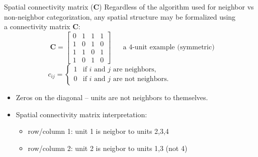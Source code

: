 \documentclass{beamer}
\begin{document}
\begin{frame}{Spatial connectivity matrix ($\bm{C}$)}
Regardless of the algorithm used for neighbor vs non-neighbor categorization, any spatial structure may be formalized using \\a connectivity matrix $\bm{C}$:
$$
~~\bm{C} = \begin{bmatrix}
0 & 1 & 1 & 1 \\
1 & 0 & 1 & 0 \\
1 & 1 & 0 & 1 \\
1 & 0 & 1 & 0
\end{bmatrix}\quad \text{~~a 4-unit example (symmetric)}$$
$$c_{ij}=
	\begin{cases}
	1 & \text{if $i$ and $j$ are neighbors,}\\
	0 & \text{if $i$ and $j$ are not neighbors.~~~~~~~~~~~~~~~~~~}
	\end{cases}$$
\begin{itemize}
	\item Zeros on the diagonal -- units are not neighbors to themselves.
	\smallskip
	\item Spatial connectivity matrix interpretation: 
	\smallskip
	\begin{itemize}
		\item row/column 1: unit 1 is neigbor to units 2,3,4
		\item row/column 2: unit 2 is neigbor to units 1,3 (not 4)
	\end{itemize}
\end{itemize}
\end{frame}
\end{document}

